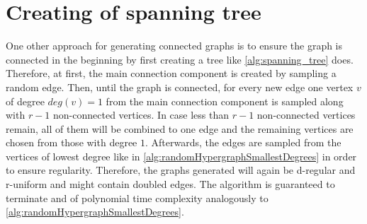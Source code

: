 \section{Creating of spanning tree}
One other approach for generating connected graphs is to ensure the graph is connected in the beginning by first creating a tree like  \cref{alg:spanning_tree} does. Therefore, at first, the main connection component is created by sampling a random edge. Then, until the graph is connected, for every new edge one vertex $v$ of degree $deg(v) = 1$ from the main connection component is sampled along with $r-1$ non-connected vertices. In case less than $r-1$ non-connected vertices remain, all of them will be combined to one edge and the remaining vertices are chosen from those with degree $1$.
Afterwards, the edges are sampled from the vertices of lowest degree like in \cref{alg:randomHypergraphSmallestDegrees} in order to ensure regularity.
Therefore, the graphs generated will again be d-regular and r-uniform and might contain doubled edges. The algorithm is guaranteed to terminate and of polynomial time complexity analogously to \cref{alg:randomHypergraphSmallestDegrees}.


